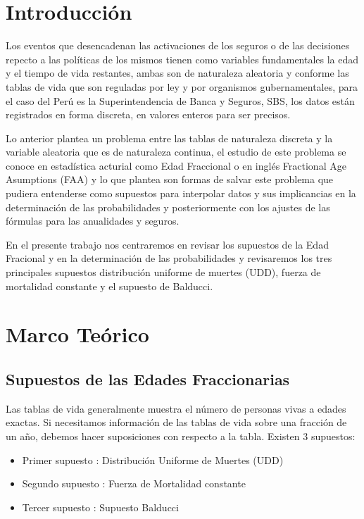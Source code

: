 \documentclass[12pt]{report}
\begin{document}


\tableofcontents  




\chapter{Introducci\'on}

Los eventos que desencadenan las activaciones de los seguros o de las decisiones repecto a las políticas de los mismos tienen como variables fundamentales la edad y el tiempo de vida restantes, ambas son de naturaleza aleatoria y conforme las tablas de vida que son reguladas por ley y por organismos gubernamentales, para el caso del Perú es la Superintendencia de Banca y Seguros, SBS, los datos están registrados en forma discreta, en valores enteros para ser precisos.


Lo anterior plantea un problema entre las tablas de naturaleza discreta y la variable aleatoria que es de naturaleza continua, el estudio de este problema se conoce en estadística acturial como Edad Fraccional o en inglés Fractional Age Asumptions (FAA) y lo que plantea son formas de salvar este problema que pudiera entenderse como supuestos para interpolar datos y sus implicancias en la determinación de las probabilidades y posteriormente con los ajustes de las fórmulas para las anualidades y seguros.


En el presente trabajo nos centraremos en revisar los supuestos de la Edad Fracional y en la determinación de las probabilidades y revisaremos los tres principales supuestos distribución uniforme de muertes (UDD), fuerza de mortalidad constante y el supuesto de Balducci.

\chapter{Marco Te\'orico}

\section{Supuestos de las Edades Fraccionarias}
\setcounter{equation}{0}

Las tablas de vida generalmente muestra el n\'umero de personas vivas a edades exactas. Si necesitamos informaci\'on de las tablas de vida sobre una fracci\'on de un a\~no, debemos hacer suposiciones con respecto a la tabla. Existen 3 supuestos:

\begin{itemize}
\item Primer supuesto : Distribuci\'on Uniforme de Muertes (UDD)
\item Segundo supuesto : Fuerza de Mortalidad constante
\item Tercer supuesto : Supuesto Balducci
\end{itemize}
\end{document}
